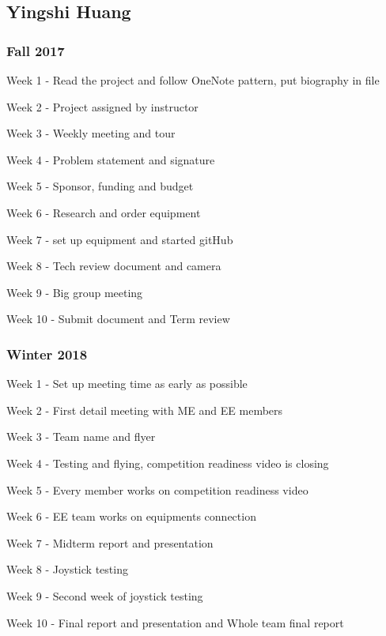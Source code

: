 \documentclass[onecolumn, draftclsnofoot,10pt, compsoc]{IEEEtran}
\begin{document}
\subsection{Yingshi Huang}
\subsubsection{Fall 2017}
		\begin{description}
			\item{Week 1} - Read the project and follow OneNote pattern, put biography in file
			\item{Week 2} - Project assigned by instructor
			\item{Week 3} - Weekly meeting and tour
            \item{Week 4} - Problem statement and signature
			\item{Week 5} - Sponsor, funding and budget 
			\item{Week 6} - Research and order equipment
            \item{Week 7} - set up equipment and started gitHub
			\item{Week 8} - Tech review document and camera 
			\item{Week 9} - Big group meeting 
            \item{Week 10} - Submit document and Term review
		\end{description}
\subsubsection{Winter 2018}
		\begin{description}
			\item{Week 1} - Set up meeting time as early as possible
			\item{Week 2} - First detail meeting with ME and EE members
			\item{Week 3} - Team name and flyer
            \item{Week 4} - Testing and flying, competition readiness video is closing
			\item{Week 5} - Every member works on competition readiness video
			\item{Week 6} - EE team works on equipments connection
            \item{Week 7} - Midterm report and presentation
			\item{Week 8} - Joystick testing
			\item{Week 9} - Second week of joystick testing
            \item{Week 10} - Final report and presentation and Whole team final report
		\end{description}
\end{document}

